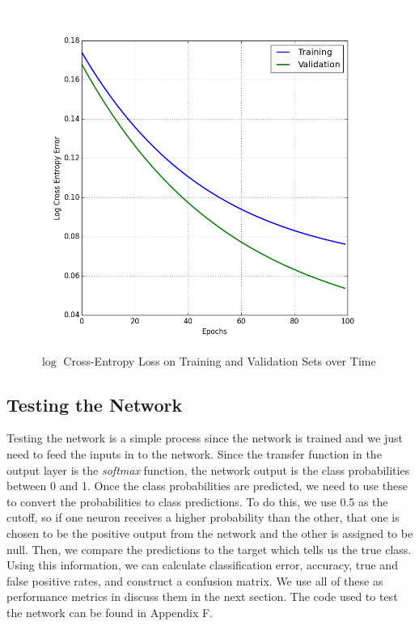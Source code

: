 \documentclass[12pt,halfline,a4paper]{ouparticle}
\begin{document}
\begin{figure}[H]
\centering
\includegraphics[width = 5in]{figs/CEloss.png}
\caption{$\log$ Cross-Entropy Loss on Training and Validation Sets over Time}
\end{figure}  

\subsection{Testing the Network}
Testing the network is a simple process since the network is trained and we just need to feed the inputs in to the network. Since the transfer function in the output layer is the \emph{softmax} function, the network output is the class probabilities between 0 and 1. Once the class probabilities are predicted, we need to use these to convert the probabilities to class predictions. To do this, we use 0.5 as the cutoff, so if one neuron receives a higher probability than the other, that one is chosen to be the positive output from the network and the other is assigned to be null. Then, we compare the predictions to the target which tells us the true class. Using this information, we can calculate classification error, accuracy, true and false positive rates, and construct a confusion matrix. We use all of these as performance metrics in discuss them in the next section. The code used to test the network can be found in Appendix F.
\end{document}

